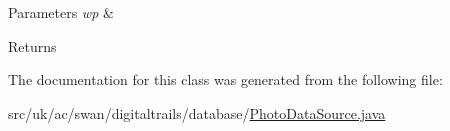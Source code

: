 \begin{DoxyParams}{Parameters}
{\em wp} & \\
\hline
\end{DoxyParams}
\begin{DoxyReturn}{Returns}

\end{DoxyReturn}


The documentation for this class was generated from the following file\+:\begin{DoxyCompactItemize}
\item 
src/uk/ac/swan/digitaltrails/database/\hyperlink{_photo_data_source_8java}{Photo\+Data\+Source.\+java}\end{DoxyCompactItemize}
